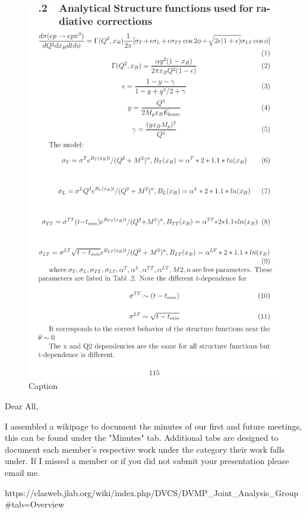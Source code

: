 \documentclass[oneside]{book}
\begin{document}
\begin{figure}
    \centering
    \includegraphics[scale=0.4]{radCorCLAS6.png}
    \caption{Caption}
    \label{fig:my_label}
\end{figure}










Dear All,

I assembled a wikipage to document the minutes of our first and future meetings, this can be found under the "Minutes" tab. Additional tabs are designed to document each member's respective work under the category their work falls under. If I missed a member or if you did not submit your presentation please email me.

https://clasweb.jlab.org/wiki/index.php/DVCS/DVMP_Joint_Analysis_Group#tab=Overview
\end{document}
